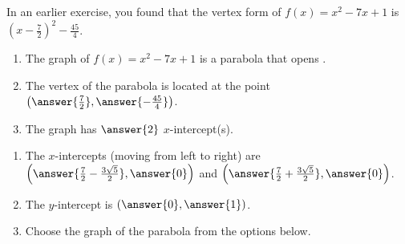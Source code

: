 \documentclass{ximera}
\author{Kenneth Berglund}
\begin{document}
In an earlier exercise, you found that the vertex form of $f(x)=x^2-7x+1$ is $\left(x -\frac{7}{2}\right)^2 - \frac{45}{4}$.

\begin{exercise}
\begin{enumerate}
\item The graph of $f(x)=x^2-7x+1$ is a parabola that opens .

\item The vertex of the parabola is located at the point $\left(\answer{\frac{7}{2}}, \answer{-\frac{45}{4}}\right)$.

\item The graph has $\answer{2}$ $x$-intercept(s).
\end{enumerate}
\begin{exercise}
\begin{enumerate}
\item The $x$-intercepts (moving from left to right) are $\left(\answer{\frac{7}{2} - \frac{3\sqrt{5}}{2}}, \answer{0}\right)$ and $\left(\answer{\frac{7}{2} + \frac{3\sqrt{5}}{2}}, \answer{0}\right)$.

\item The $y$-intercept is $(\answer{0}, \answer{1})$.

\item Choose the graph of the parabola from the options below.

\begin{image}
\end{image} 


\end{enumerate}
\end{exercise}
\end{exercise}
\end{document}
